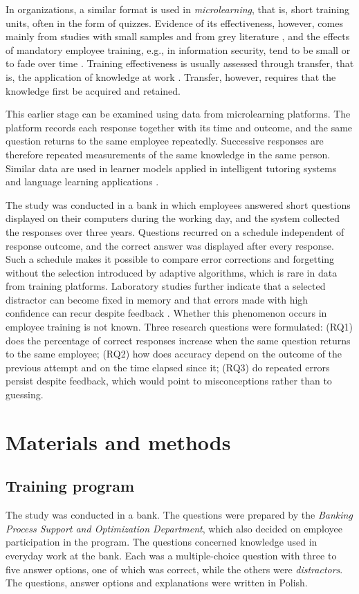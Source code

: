 \documentclass[11pt]{article}
\begin{document}
In organizations, a similar format is used in \emph{microlearning}, that is, short training units,
often in the form of quizzes. Evidence of its effectiveness, however, comes mainly from studies with
small samples and from grey literature \citep{taylor2022}, and the effects of mandatory employee
training, e.g., in information security, tend to be small or to fade over time
\citep{reinheimer2020}. Training effectiveness is usually assessed through transfer, that is, the
application of knowledge at work \citep{blume2010}. Transfer, however, requires that the knowledge
first be acquired and retained.

This earlier stage can be examined using data from microlearning platforms. The platform records each
response together with its time and outcome, and the same question returns to the same employee
repeatedly. Successive responses are therefore repeated measurements of the same knowledge in the same
person. Similar data are used in learner models applied in intelligent tutoring systems and language
learning applications \citep{corbett1994,settles2016}.

The study was conducted in a bank in which employees answered short questions displayed on their
computers during the working day, and the system collected the responses over three years. Questions
recurred on a schedule independent of response outcome, and the correct answer was displayed after
every response. Such a schedule makes it possible to compare error corrections and forgetting without
the selection introduced by adaptive algorithms, which is rare in data from training platforms.
Laboratory studies further indicate that a selected distractor can become fixed in memory and that
errors made with high confidence can recur despite feedback \citep{butler2008,butler2011}. Whether this
phenomenon occurs in employee training is not known. Three research questions were formulated:
(RQ1) does the percentage of correct responses increase when the same question returns to the same
employee;
(RQ2) how does accuracy depend on the outcome of the previous attempt and on the time elapsed since it;
(RQ3) do repeated errors persist despite feedback, which would point to misconceptions rather than to
guessing.
\section{Materials and methods}

\subsection{Training program}
The study was conducted in a bank. The questions were prepared by the \textit{Banking Process Support
and Optimization Department}, which also decided on employee participation in the program. The
questions concerned knowledge used in everyday work at the bank. Each was a multiple-choice question
with three to five answer options, one of which was correct, while the others were
\emph{distractors}. The questions, answer options and explanations were written in Polish.
\end{document}

